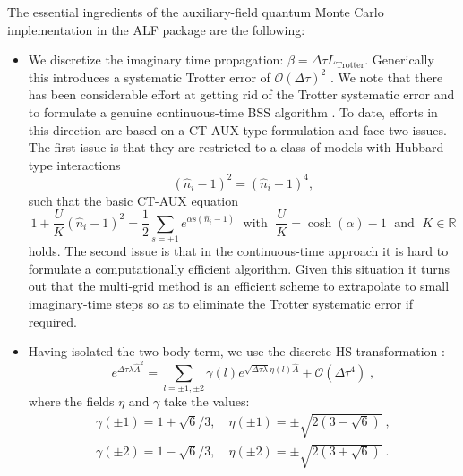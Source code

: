 The essential ingredients of the auxiliary-field quantum Monte Carlo implementation in the ALF package are the following:
\begin{itemize}
\item  We discretize the imaginary time propagation: $\beta = \Delta \tau L_{\text{Trotter}} $. Generically this introduces a systematic Trotter error of $\mathcal{O}(\Delta \tau)^2$  \cite{Fye86}. 
We note that there has been considerable effort at getting rid of the Trotter systematic error and to formulate a genuine continuous-time BSS  algorithm \cite{Iazzi15}.   To date, efforts in this direction are based on a CT-AUX type formulation \cite{Rombouts99,Gull08} and   face  two issues. The first issue is that they are restricted to a class of models with Hubbard-type interactions
\begin{equation}
        \left(  \hat{n}_{i}- 1\right)^{2}  = \left(  \hat{n}_{i}- 1\right)^{4} ,
\end{equation}
such that  the  basic CT-AUX equation \cite{Rombouts98}
\begin{equation}
          1   + \frac{U}{K} \left(  \hat{n}_{i}- 1\right)^{2}    = \frac{1}{2}\sum_{s=\pm 1}   e^{ \alpha s \left(  \hat{n}_{i}- 1\right) }  \; \text{ with  }  \;  \frac{U}{K} = \cosh(\alpha) -1 \; \text{ and  }  \; K\in\mathbb{R}
\end{equation}
holds.
The second issue is that in the continuous-time  approach it is hard to formulate a  computationally efficient algorithm.  Given this situation it turns out that the multi-grid method \cite{Rost12,Rost13,Bluemer08}  is an efficient  scheme to   extrapolate to  small imaginary-time steps so as to  eliminate the Trotter systematic error if required.
\item  Having isolated the two-body term,  we use  the   discrete HS transformation \cite{Motome97,Assaad97}:
\begin{equation}
\label{HS_squares}
        e^{\Delta \tau  \lambda  \hat{A}^2 } =
        \sum_{ l = \pm 1, \pm 2}  \gamma(l)
e^{ \sqrt{\Delta \tau \lambda }
       \eta(l)  \hat{A} }
                + \mathcal{O} (\Delta \tau ^4)\;,
\end{equation}
where the fields $\eta$ and $\gamma$ take the values:
\begin{align}
 \gamma(\pm 1)  = 1 + \sqrt{6}/3, \quad  \eta(\pm 1 ) = \pm \sqrt{2 \left(3 - \sqrt{6} \right)}\;,\\\nonumber
  \gamma(\pm 2) = 1 - \sqrt{6}/3, \quad  \eta(\pm 2 ) = \pm \sqrt{2 \left(3 + \sqrt{6} \right)}\;.
\nonumber

\end{align}
\end{itemize}
